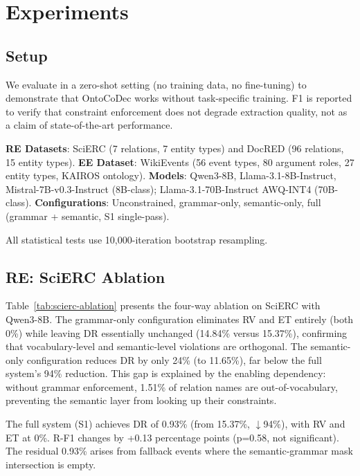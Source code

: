 \documentclass[11pt,a4paper]{article}
\newcommand{\ours}{OntoCoDec}
\newcommand{\drsym}{\textsc{DR}}
\newcommand{\rvsym}{\textsc{RV}}
\newcommand{\etsym}{\textsc{ET}}
\begin{document}
\section{Experiments}

\subsection{Setup}

We evaluate in a zero-shot setting (no training data, no fine-tuning) to demonstrate that \ours{} works without task-specific training. F1 is reported to verify that constraint enforcement does not degrade extraction quality, not as a claim of state-of-the-art performance.

\textbf{RE Datasets}: SciERC (7 relations, 7 entity types) and DocRED (96 relations, 15 entity types).
\textbf{EE Dataset}: WikiEvents (56 event types, 80 argument roles, 27 entity types, KAIROS ontology).
\textbf{Models}: Qwen3-8B, Llama-3.1-8B-Instruct, Mistral-7B-v0.3-Instruct (8B-class); Llama-3.1-70B-Instruct AWQ-INT4 (70B-class).
\textbf{Configurations}: Unconstrained, grammar-only, semantic-only, full (grammar + semantic, S1 single-pass).

All statistical tests use 10,000-iteration bootstrap resampling.

\subsection{RE: SciERC Ablation}
\label{sec:scierc-ablation}

Table~\ref{tab:scierc-ablation} presents the four-way ablation on SciERC with Qwen3-8B. The grammar-only configuration eliminates \rvsym{} and \etsym{} entirely (both 0\%) while leaving \drsym{} essentially unchanged (14.84\% versus 15.37\%), confirming that vocabulary-level and semantic-level violations are orthogonal. The semantic-only configuration reduces \drsym{} by only 24\% (to 11.65\%), far below the full system's 94\% reduction. This gap is explained by the enabling dependency: without grammar enforcement, 1.51\% of relation names are out-of-vocabulary, preventing the semantic layer from looking up their constraints.

The full system (S1) achieves \drsym{} of 0.93\% (from 15.37\%, $\downarrow$94\%), with \rvsym{} and \etsym{} at 0\%. R-F1 changes by +0.13 percentage points (p=0.58, not significant). The residual 0.93\% arises from fallback events where the semantic-grammar mask intersection is empty.
\end{document}
